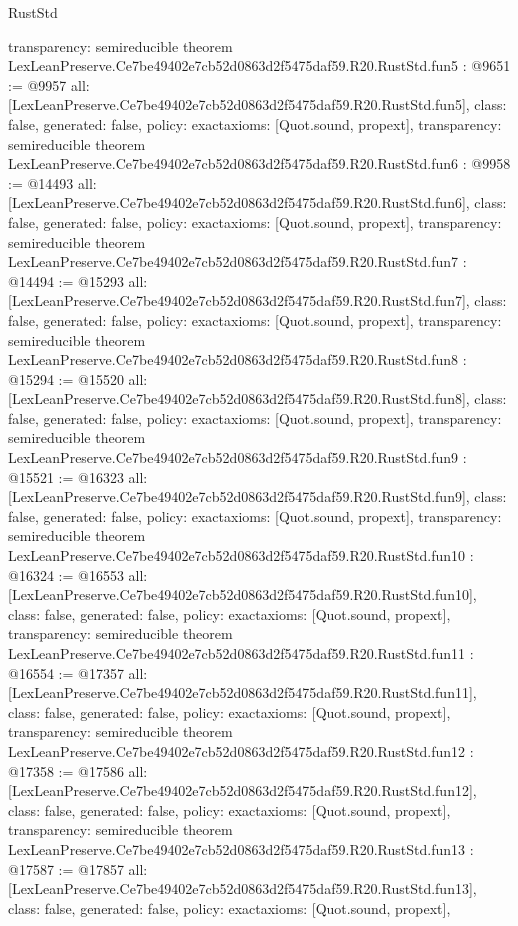 \begin{lexlean}{RustStd}
\begin{coremodule}
{  transparency: semireducible
}
theorem LexLeanPreserve.Ce7be49402e7cb52d0863d2f5475daf59.R20.RustStd.fun5 : @9651 := @9957 {
  all: [LexLeanPreserve.Ce7be49402e7cb52d0863d2f5475daf59.R20.RustStd.fun5],
  class: false,
  generated: false,
  policy: exact{axioms: [Quot.sound, propext]},
  transparency: semireducible
}
theorem LexLeanPreserve.Ce7be49402e7cb52d0863d2f5475daf59.R20.RustStd.fun6 : @9958 := @14493 {
  all: [LexLeanPreserve.Ce7be49402e7cb52d0863d2f5475daf59.R20.RustStd.fun6],
  class: false,
  generated: false,
  policy: exact{axioms: [Quot.sound, propext]},
  transparency: semireducible
}
theorem LexLeanPreserve.Ce7be49402e7cb52d0863d2f5475daf59.R20.RustStd.fun7 : @14494 := @15293 {
  all: [LexLeanPreserve.Ce7be49402e7cb52d0863d2f5475daf59.R20.RustStd.fun7],
  class: false,
  generated: false,
  policy: exact{axioms: [Quot.sound, propext]},
  transparency: semireducible
}
theorem LexLeanPreserve.Ce7be49402e7cb52d0863d2f5475daf59.R20.RustStd.fun8 : @15294 := @15520 {
  all: [LexLeanPreserve.Ce7be49402e7cb52d0863d2f5475daf59.R20.RustStd.fun8],
  class: false,
  generated: false,
  policy: exact{axioms: [Quot.sound, propext]},
  transparency: semireducible
}
theorem LexLeanPreserve.Ce7be49402e7cb52d0863d2f5475daf59.R20.RustStd.fun9 : @15521 := @16323 {
  all: [LexLeanPreserve.Ce7be49402e7cb52d0863d2f5475daf59.R20.RustStd.fun9],
  class: false,
  generated: false,
  policy: exact{axioms: [Quot.sound, propext]},
  transparency: semireducible
}
theorem LexLeanPreserve.Ce7be49402e7cb52d0863d2f5475daf59.R20.RustStd.fun10 : @16324 := @16553 {
  all: [LexLeanPreserve.Ce7be49402e7cb52d0863d2f5475daf59.R20.RustStd.fun10],
  class: false,
  generated: false,
  policy: exact{axioms: [Quot.sound, propext]},
  transparency: semireducible
}
theorem LexLeanPreserve.Ce7be49402e7cb52d0863d2f5475daf59.R20.RustStd.fun11 : @16554 := @17357 {
  all: [LexLeanPreserve.Ce7be49402e7cb52d0863d2f5475daf59.R20.RustStd.fun11],
  class: false,
  generated: false,
  policy: exact{axioms: [Quot.sound, propext]},
  transparency: semireducible
}
theorem LexLeanPreserve.Ce7be49402e7cb52d0863d2f5475daf59.R20.RustStd.fun12 : @17358 := @17586 {
  all: [LexLeanPreserve.Ce7be49402e7cb52d0863d2f5475daf59.R20.RustStd.fun12],
  class: false,
  generated: false,
  policy: exact{axioms: [Quot.sound, propext]},
  transparency: semireducible
}
theorem LexLeanPreserve.Ce7be49402e7cb52d0863d2f5475daf59.R20.RustStd.fun13 : @17587 := @17857 {
  all: [LexLeanPreserve.Ce7be49402e7cb52d0863d2f5475daf59.R20.RustStd.fun13],
  class: false,
  generated: false,
  policy: exact{axioms: [Quot.sound, propext]},
}
\end{coremodule}
\end{lexlean}
